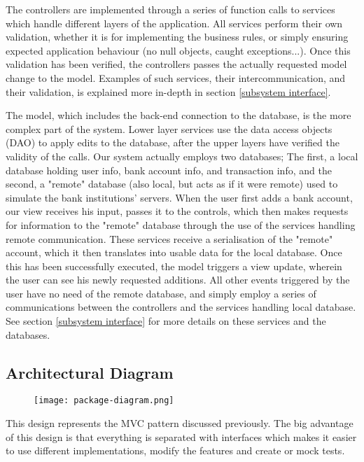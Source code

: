 \documentclass[12pt]{article}
\begin{document}
The controllers are implemented through a series of function calls to services which handle different layers of the application. All services perform their own validation, whether it is for implementing the business rules, or simply ensuring expected application behaviour (no null objects, caught exceptions...). Once this validation has been verified, the controllers passes the actually requested model change to the model. Examples of such services, their intercommunication, and their validation, is explained more in-depth in section \ref{subsystem interface}.

The model, which includes the back-end connection to the database, is the more complex part of the system. Lower layer services use the data access objects (DAO) to apply edits to the database, after the upper layers have verified the validity of the calls. Our system actually employs two databases; The first, a local database holding user info, bank account info, and transaction info, and the second, a "remote" database (also local, but acts as if it were remote) used to simulate the bank institutions' servers. When the user first adds a bank account, our view receives his input, passes it to the controls, which then makes requests for information to the "remote" database through the use of the services handling remote communication. These services receive a serialisation of the "remote" account, which it then translates into usable data for the local database. Once this has been successfully executed, the model triggers a view update, wherein the user can see his newly requested additions. All other events triggered by the user have no need of the remote database, and simply employ a series of communications between the controllers and the services handling local database. See section \ref{subsystem interface} for more details on these services and the databases.

\subsection{Architectural Diagram}

\begin{figure}[H]
\texttt{[image: package-diagram.png]}
\end{figure}

This design represents the MVC pattern discussed previously. The big advantage of this design is that everything is separated with interfaces which makes it easier to use different implementations, modify the features and create or mock tests.
\end{document}
